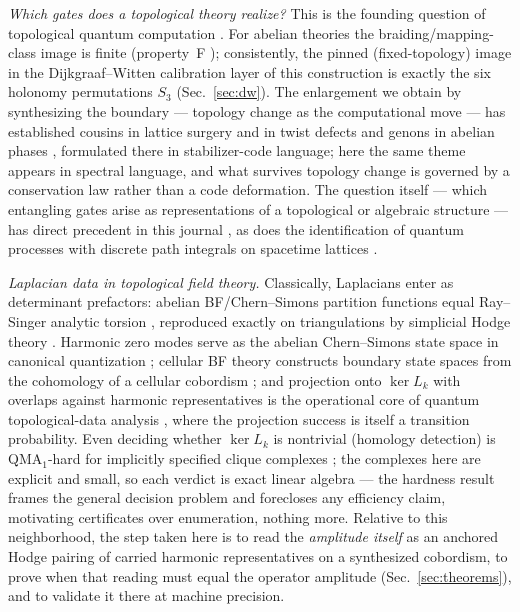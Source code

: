 \documentclass[a4paper,twocolumn,11pt,unpublished]{quantumarticle}
\theoremstyle{plain}
\theoremstyle{remark}
\newcommand{\kerL}{\ker L}
\begin{document}
\emph{Which gates does a topological theory realize?} This is the founding
question of topological quantum computation
\cite{Freedman2003TQC,FreedmanKitaevWang2002Simulation,FreedmanLarsenWang2002Universal}.
For abelian theories the braiding/mapping-class image is finite
(property~F \cite{NaiduRowell2011PropertyF}); consistently, the pinned
(fixed-topology) image in the Dijkgraaf--Witten calibration layer of this
construction is exactly the six holonomy permutations $S_3$
(Sec.~\ref{sec:dw}). The enlargement we obtain by synthesizing the boundary
--- topology change as the computational move --- has established cousins
in lattice surgery \cite{Horsman2012LatticeSurgery} and in twist defects
and genons in abelian phases
\cite{Bombin2010Twist,BarkeshliJianQi2013TwistDefects}, formulated there
in stabilizer-code language; here the same theme appears in spectral
language, and what survives topology change is governed by a conservation
law rather than a code deformation. The question itself --- which
entangling gates arise as representations of a topological or algebraic
structure --- has direct precedent in this journal
\cite{Padmanabhan2020Braiding}, as does the identification of quantum
processes with discrete path integrals on spacetime lattices
\cite{Bauer2024FixedPoint}.

\emph{Laplacian data in topological field theory.} Classically, Laplacians
enter as determinant prefactors: abelian BF/Chern--Simons partition
functions equal Ray--Singer analytic torsion
\cite{RaySinger1971RTorsion,Schwarz1978Torsion,Witten1989Jones},
reproduced exactly on triangulations by simplicial Hodge theory
\cite{Adams1996RTorsion,Adams1997DoubledCS}. Harmonic zero modes serve
as the abelian Chern--Simons state space in canonical quantization
\cite{BosNair1989Blocks}; cellular BF theory constructs boundary state
spaces from the cohomology of a cellular cobordism
\cite{CattaneoMnevReshetikhin2020Cellular}; and projection onto
$\kerL_k$ with overlaps against harmonic representatives is the
operational core of quantum topological-data analysis
\cite{Lloyd2016TopologicalData,Hayakawa2022Persistent,Gyurik2022TDA},
where the projection success is itself a transition probability. Even
deciding whether $\kerL_k$ is nontrivial (homology detection) is
QMA$_1$-hard for implicitly specified clique complexes
\cite{CrichignoKohler2024Clique}; the complexes here are explicit and
small, so each verdict is exact linear algebra --- the hardness result
frames the general decision problem and forecloses any efficiency claim,
motivating certificates over enumeration, nothing more. Relative to this
neighborhood, the step taken here is to read the \emph{amplitude itself}
as an anchored Hodge pairing of carried harmonic representatives on a
synthesized cobordism, to prove when that reading must equal the operator
amplitude (Sec.~\ref{sec:theorems}), and to validate it there at machine
precision.
\end{document}
